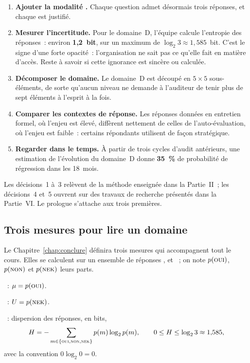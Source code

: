 \begin{enumerate}
    \item \textbf{Ajouter la modalité \NEK{}.} Chaque question admet
          désormais trois réponses, et chaque \NEK{} est justifié.
    \item \textbf{Mesurer l'incertitude.} Pour le domaine~D, l'équipe
          calcule l'entropie des réponses~: environ \textbf{1,2~bit}, sur un
          maximum de $\log_2 3 \approx 1{,}585$~bit. C'est le signe d'une
          forte opacité~: l'organisation ne sait pas ce qu'elle fait en
          matière d'accès. Reste à savoir si cette ignorance est sincère ou
          calculée.
    \item \textbf{Décomposer le domaine.} Le domaine~D est découpé en
          $5 \times 5$ sous-éléments, de sorte qu'aucun niveau ne demande à
          l'auditeur de tenir plus de sept éléments à l'esprit à la fois.
    \item \textbf{Comparer les contextes de réponse.} Les réponses données en
          entretien formel, où l'enjeu est élevé, diffèrent nettement de
          celles de l'auto-évaluation, où l'enjeu est faible~: certains
          répondants utilisent \NEK{} de façon stratégique.
    \item \textbf{Regarder dans le temps.} À partir de trois cycles d'audit
          antérieurs, une estimation de l'évolution du domaine~D donne
          \textbf{35~\%} de probabilité de régression dans les 18~mois.
\end{enumerate}

Les décisions~1 à~3 relèvent de la méthode enseignée dans la Partie~II~;
les décisions~4 et~5 ouvrent sur des travaux de recherche présentés dans la
Partie~VI. Le prologue s'attache aux trois premières.

\subsection{Trois mesures pour lire un domaine}

Le Chapitre~\ref{chap:conclure} définira trois mesures qui accompagnent
tout le cours. Elles se calculent sur un ensemble de réponses \OUI{},
\NON{} et \NEK{}~; on note $p(\textsc{oui})$, $p(\textsc{non})$ et $p(\textsc{nek})$ leurs parts.

\begin{boxdef}
~: $\mu = p(\textsc{oui})$.

\medskip
{}~: $U = p(\textsc{nek})$.

\medskip
{}~: dispersion des réponses, en bits,
\[
    H = -\sum_{m \in \{\textsc{oui}, \textsc{non}, \textsc{nek}\}} p(m) \log_2 p(m),
    \qquad 0 \leq H \leq \log_2 3 \approx 1{,}585,
\]
avec la convention $0 \log_2 0 = 0$.
\end{boxdef}

